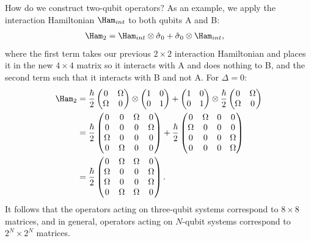 \documentclass[a4paper, 11pt, normalem]{report}
\begin{document}
How do we construct two-qubit operators?
As an example, we apply the interaction Hamiltonian $\Ham_{int}$ to both qubits A and B:
\begin{align}
    \Ham_2 &= \Ham_{int}\otimes\hat{\sigma}_0 + \hat{\sigma}_0\otimes\Ham_{int},
\end{align}
where the first term takes our previous $2\times2$ interaction Hamiltonian and places it in the new $4\times4$ matrix so it interacts with A and does nothing to B, and the second term such that it interacts with B and not A.
For $\Delta=0$:
\begin{align}
    \Ham_2 &= \frac{\hbar}{2}\begin{pmatrix}0&\Omega\\\Omega&0\end{pmatrix}\otimes\begin{pmatrix}1&0\\0&1\end{pmatrix} + \begin{pmatrix} 1&0\\0&1\end{pmatrix}\otimes\frac{\hbar}{2}\begin{pmatrix}0&\Omega\\\Omega&0\end{pmatrix} \\
           &= \frac{\hbar}{2}\begin{pmatrix} 0 & 0 & \Omega & 0 \\ 0 & 0 & 0 & \Omega \\ \Omega & 0 & 0 & 0 \\ 0 & \Omega & 0 & 0 \end{pmatrix} +\frac{\hbar}{2} \begin{pmatrix} 0 & \Omega & 0 & 0 \\ \Omega & 0 & 0 & 0 \\ 0 & 0 & 0 & \Omega \\ 0 & 0 & 0 & \Omega\end{pmatrix} \\
           &= \frac{\hbar}{2} \begin{pmatrix} 0 &\Omega & \Omega & 0 \\ \Omega & 0 & 0 &\Omega \\ \Omega & 0 & 0 & \Omega \\ 0 & \Omega & \Omega & 0 \end{pmatrix}.
\end{align}
It follows that the operators acting on three-qubit systems correspond to $8\times8$ matrices, and in general, operators acting on $N$-qubit systems correspond to $2^N\times2^N$ matrices.
\end{document}
